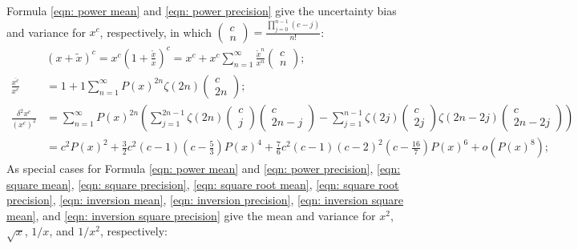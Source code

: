 \documentclass[twoside]{article}
\numberwithin{equation}{section}
\begin{document}
Formula \eqref{eqn: power mean} and \eqref{eqn: power precision} give the uncertainty bias and variance for $x^c$, respectively, in which $\begin{pmatrix} c \\ n \end{pmatrix} = \frac{\prod_{j=0}^{n-1} (c -j)}{n!}$:
\begin{align}
\label{eqn: power Taylor}
&(x + \tilde{x})^c = x^c (1 + \frac{\tilde{x}}{x})^c = x^c + x^c \sum_{n=1}^{\infty} \frac{\tilde{x}^n}{x^n} \begin{pmatrix} c \\ n \end{pmatrix}; \\
\label{eqn: power mean}
\frac{\overline{x^c}}{x^c}  &= 1 + 1 \sum_{n=1}^{\infty} P(x)^{2n} \zeta(2n) \begin{pmatrix} c \\ 2 n \end{pmatrix}; \\
\label{eqn: power precision}
\frac{\delta^2 x^c}{(x^c)^2} &= \sum_{n=1}^{\infty} P(x)^{2n} 
 \left( \sum_{j=1}^{2n-1} \zeta(2n) \begin{pmatrix} c \\ j \end{pmatrix} \begin{pmatrix} c \\ 2n - j \end{pmatrix}
 - \sum_{j=1}^{n-1} \zeta(2j) \begin{pmatrix} c \\ 2j \end{pmatrix} \zeta(2n - 2j) \begin{pmatrix} c \\ 2n -2 j \end{pmatrix}  \right)\\
 &= c^2 P(x)^2 + \frac{3}{2} c^2 (c-1) (c - \frac{5}{3}) P(x)^4 + \frac{7}{6} c^2 (c-1) (c-2)^2 (c - \frac{16}{7}) P(x)^6 + o(P(x)^8);
\end{align}
As special cases for Formula \eqref{eqn: power mean} and \eqref{eqn: power precision}, \eqref{eqn: square mean}, \eqref{eqn: square precision}, \eqref{eqn: square root mean}, \eqref{eqn: square root precision}, \eqref{eqn: inversion mean}, \eqref{eqn: inversion precision}, \eqref{eqn: inversion square mean}, and \eqref{eqn: inversion square precision} give the mean and variance for $x^2$, $\sqrt{x}$, $1/x$, and $1/x^2$, respectively: 
\end{document}
